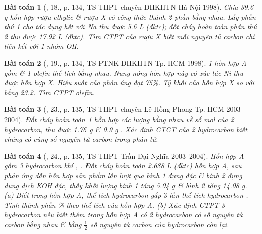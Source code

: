 \documentclass{article}
\newtheorem{baitoan}{Bài toán}
\begin{document}
\begin{baitoan}[\cite{An_Hoa_Hoc_nang_cao_8_9}, 18., p. 134, TS THPT chuyên ĐHKHTN Hà Nội 1998]
	Chia {\rm39.6 g} hỗn hợp rượu ethylic \& rượu X có công thức {\rm{}} thành 2 phần bằng nhau. Lấy phần thứ 1 cho tác dụng hết với {\rm Na} thu được {\rm5.6 L } (đktc); đốt cháy hoàn toàn phần thứ 2 thu được {\rm17.92 L } (đktc). Tìm {\rm CTPT} của rượu X biết mỗi nguyên tử carbon chỉ liên kết với 1 nhóm {\rm OH}.
\end{baitoan}

\begin{baitoan}[\cite{An_Hoa_Hoc_nang_cao_8_9}, 19., p. 134, TS PTNK ĐHKHTN Tp. HCM 1998]
	1 hỗn hợp A gồm {\rm{}} \& 1 olefin thể tích bằng nhau. Nung nóng hỗn hợp này có xúc tác {\rm Ni} thu được hỗn hợp X. Hiệu suất của phản ứng đạt {\rm75\%}. Tỷ khối của hỗn hợp X so với {\rm{}} bằng {\rm23.2}. Tìm {\rm CTPT} olefin.
\end{baitoan}

\begin{baitoan}[\cite{An_Hoa_Hoc_nang_cao_8_9}, 23., p. 135, TS THPT chuyên Lê Hồng Phong Tp. HCM 2003--2004]
	Đốt cháy hoàn toàn 1 hỗn hợp các lượng bằng nhau về số mol của 2 hydrocarbon, thu được {\rm1.76 g } \& {\rm0.9 g }. Xác định {\rm CTCT} của 2 hydrocarbon biết chúng có cùng số nguyên tử carbon trong phân tử.
\end{baitoan}

\begin{baitoan}[\cite{An_Hoa_Hoc_nang_cao_8_9}, 24., p. 135, TS THPT Trần Đại Nghĩa 2003--2004]
	Hỗn hợp A gồm 3 hydrocarbon khí {\rm{}, }. Đốt cháy hoàn toàn {\rm2.688 L} (đktc) hỗn hợp A, sau phản ứng dẫn hỗn hợp sản phẩm lần lượt qua bình 1 đựng {\rm{}} đặc \& bình 2 đựng dung dịch {\rm KOH} đặc, thấy khối lượng bình 1 tăng {\rm5.04 g} \& bình 2 tăng {\rm14.08 g}. (a) Biết trong hỗn hợp A, thể tích hydrocarbon {\rm{}} gấp $3$ lần thể tích hydrocarbon {\rm{}}. Tính thành phần {\rm\%} theo thể tích của hỗn hợp A. (b) Xác định {\rm CTPT} 3 hydrocarbon nếu biết thêm trong hỗn hợp A có 2 hydrocarbon có số nguyên tử carbon bằng nhau \& bằng $\frac{1}{2}$ số nguyên tử carbon của hydrocarbon còn lại.
\end{baitoan}


\printbibliography[heading=bibintoc]
\end{document}
